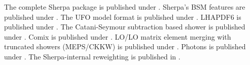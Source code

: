 \documentclass{article}
\begin{document}
The complete Sherpa package is published under \cite{Gleisberg:2008ta}.
Sherpa's BSM features are published under \cite{Hoche:2014kca}.
The UFO model format is published under \cite{Degrande:2011ua}.
LHAPDF6 is published under \cite{Buckley:2014ana}.
The Catani-Seymour subtraction based shower is published under \cite{Schumann:2007mg}.
Comix is published under \cite{Gleisberg:2008fv}.
LO/LO matrix element merging with truncated showers (MEPS/CKKW) is published under \cite{Hoeche:2009rj}.
Photons is published under \cite{Schonherr:2008av}.
The Sherpa-internal reweighting is published in \cite{Bothmann:2016nao}.
\end{document}

